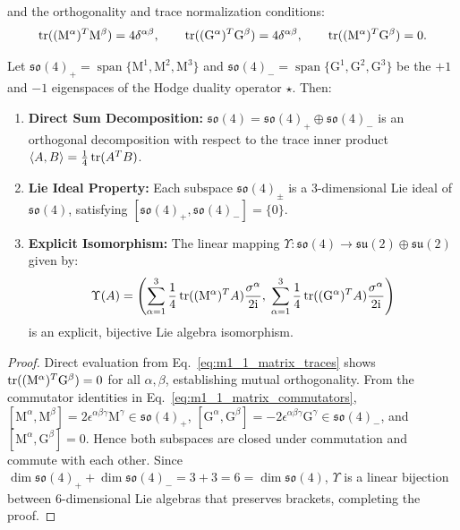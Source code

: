 and the orthogonality and trace normalization conditions:
\begin{equation}
\label{eq:m1_1_matrix_traces}
\operatorname{tr}((\mathrm{M}^\alpha)^T \mathrm{M}^\beta) = 4 \delta^{\alpha\beta}, \qquad \operatorname{tr}((\mathrm{G}^\alpha)^T \mathrm{G}^\beta) = 4 \delta^{\alpha\beta}, \qquad \operatorname{tr}((\mathrm{M}^\alpha)^T \mathrm{G}^\beta) = 0.
\end{equation}
\begin{theorem}[Explicit Lie Algebra Isomorphism \texorpdfstring{$\mathfrak{so}(4) \cong \mathfrak{su}(2)_{\mathrm{spin}} \oplus \mathfrak{su}(2)_{\mathrm{gauge}}$}{so(4) = su(2) + su(2)}]
\label{thm:m1_1_so4_isomorphism_explicit}
Let $\mathfrak{so}(4)_+ = \operatorname{span}\{\mathrm{M}^1, \mathrm{M}^2, \mathrm{M}^3\}$ and $\mathfrak{so}(4)_- = \operatorname{span}\{\mathrm{G}^1, \mathrm{G}^2, \mathrm{G}^3\}$ be the $+1$ and $-1$ eigenspaces of the Hodge duality operator $\star$. Then:
\begin{enumerate}
    \item \textbf{Direct Sum Decomposition:} $\mathfrak{so}(4) = \mathfrak{so}(4)_+ \oplus \mathfrak{so}(4)_-$ is an orthogonal decomposition with respect to the trace inner product $\langle A, B \rangle = \frac{1}{4}\operatorname{tr}(A^T B)$.
    \item \textbf{Lie Ideal Property:} Each subspace $\mathfrak{so}(4)_\pm$ is a 3-dimensional Lie ideal of $\mathfrak{so}(4)$, satisfying $[\mathfrak{so}(4)_+, \mathfrak{so}(4)_-] = \{0\}$.
    \item \textbf{Explicit Isomorphism:} The linear mapping $\Upsilon: \mathfrak{so}(4) \to \mathfrak{su}(2) \oplus \mathfrak{su}(2)$ given by:
    \begin{equation}
    \label{eq:m1_1_upsilon_iso}
    \Upsilon(A) = \left( \sum_{\alpha=1}^3 \frac{1}{4}\operatorname{tr}((\mathrm{M}^\alpha)^T A) \frac{\sigma^\alpha}{2\mathrm{i}}, \; \sum_{\alpha=1}^3 \frac{1}{4}\operatorname{tr}((\mathrm{G}^\alpha)^T A) \frac{\sigma^\alpha}{2\mathrm{i}} \right)
    \end{equation}
    is an explicit, bijective Lie algebra isomorphism.
\end{enumerate}
\end{theorem}
\begin{proof}
Direct evaluation from Eq.~\eqref{eq:m1_1_matrix_traces} shows $\operatorname{tr}((\mathrm{M}^\alpha)^T \mathrm{G}^\beta) = 0$ for all $\alpha, \beta$, establishing mutual orthogonality. From the commutator identities in Eq.~\eqref{eq:m1_1_matrix_commutators}, $[\mathrm{M}^\alpha, \mathrm{M}^\beta] = 2\epsilon^{\alpha\beta\gamma}\mathrm{M}^\gamma \in \mathfrak{so}(4)_+$, $[\mathrm{G}^\alpha, \mathrm{G}^\beta] = -2\epsilon^{\alpha\beta\gamma}\mathrm{G}^\gamma \in \mathfrak{so}(4)_-$, and $[\mathrm{M}^\alpha, \mathrm{G}^\beta] = 0$. Hence both subspaces are closed under commutation and commute with each other. Since $\dim \mathfrak{so}(4)_+ + \dim \mathfrak{so}(4)_- = 3 + 3 = 6 = \dim \mathfrak{so}(4)$, $\Upsilon$ is a linear bijection between 6-dimensional Lie algebras that preserves brackets, completing the proof.
\end{proof}

